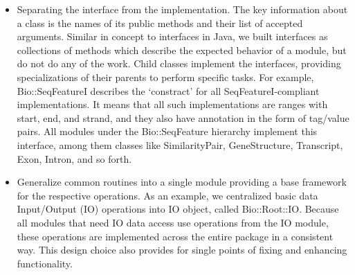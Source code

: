 \documentclass[12pt]{article}
\begin{document}
\begin{itemize}

\item Separating the interface from the implementation.  The key
information about a class is the names of its public methods and their
list
of accepted arguments.  Similar in concept to interfaces in Java, we
built interfaces as collections of methods which describe the expected
behavior of a module, but do not do any of the work.  Child classes
implement the interfaces, providing specializations of their
parents to perform specific tasks.  For example, Bio::SeqFeatureI
describes the `constract' for all SeqFeatureI-compliant
implementations. It means that all such implementations are ranges
with start, end, and strand, and they also have annotation in the form
of tag/value pairs. All modules under the Bio::SeqFeature hierarchy
implement this interface, among them classes like SimilarityPair,
GeneStructure, Transcript, Exon, Intron, and so forth.

\item Generalize common routines into a single module providing a base
framework for the respective operations.  As an example, we
centralized basic data Input/Output (IO) operations into IO object,
called Bio::Root::IO. Because all modules that need IO data access use
operations from the IO module, these operations are implemented across
the entire package in a consistent way. This design choice also
provides for single points of fixing and enhancing functionality.


\end{itemize}
\end{document}
